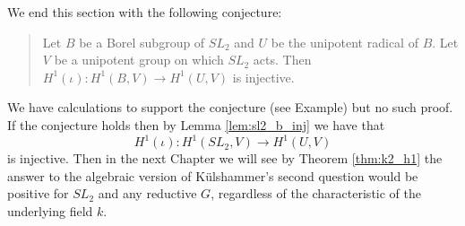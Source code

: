 We end this section with the following conjecture:
\begin{quote}
Let $B$ be a Borel subgroup of $SL_2$ and $U$ be the unipotent radical of $B$. Let $V$ be a unipotent group on which $SL_2$ acts. Then $H^1(\iota):H^1(B, V)\rightarrow H^1(U, V)$ is injective.
\end{quote}
We have calculations to support the conjecture (see Example) but no such proof. If the conjecture holds then by Lemma \ref{lem:sl2_b_inj} we have that
\begin{displaymath}
	H^1(\iota): H^1(SL_2, V)\rightarrow H^1(U, V)
\end{displaymath}
is injective.
Then in the next Chapter we will see by Theorem \ref{thm:k2_h1} the answer to the algebraic version of K\"ulshammer's second question would be positive for $SL_2$ and any reductive $G$, regardless of the characteristic of the underlying field $k$.

